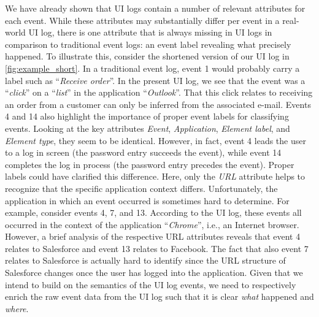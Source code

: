 We have already shown that UI logs contain a number of relevant attributes for each event. While these attributes may substantially differ per event in a real-world UI log, there is one attribute that is always missing in UI logs in comparison to traditional event logs: an event label revealing what precisely happened. To illustrate this, consider the shortened version of our UI log in \autoref{fig:example_short}. In a traditional event log, event 1 would probably carry a label such as ``\textit{Receive order}''. In the present UI log, we see that the event was a ``\textit{click}'' on a ``\textit{list}'' in the application ``\textit{Outlook}''. That this click relates to receiving an order from a customer can only be inferred from the associated e-mail. Events 4 and 14 also highlight the importance of proper event labels for classifying events. Looking at the key attributes \textit{Event}, \textit{Application}, \textit{Element label}, and \textit{Element type}, they seem to be identical. However, in fact, event 4 leads the user to a log in screen (the password entry succeeds the event), while event 14 completes the log in process (the password entry precedes the event). Proper labels could have clarified this difference. Here, only the \textit{URL} attribute helps to recognize that the specific application context differs. Unfortunately, the application in which an event occurred is sometimes hard to determine. For example, consider events 4, 7, and 13. According to the UI log, these events all occurred in the context of the application ``\textit{Chrome}'', i.e., an Internet browser. However, a brief analysis of the respective URL attributes reveals that event 4 relates to Salesforce and event 13 relates to Facebook. The fact that also event 7 relates to Salesforce is actually hard to identify since the URL structure of Salesforce changes once the user has logged into the application. Given that we intend to build on the semantics of the UI log events, we need to respectively enrich the raw event data from the UI log such that it is clear \textit{what} happened and \textit{where}. 

